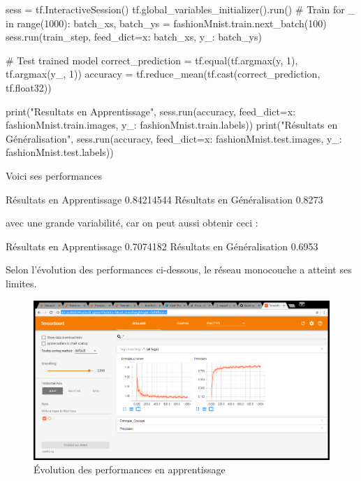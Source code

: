\documentclass[a4paper,11pt]{book}
\theoremstyle{theo}
\begin{document}
\begin{mypython}
sess = tf.InteractiveSession()
tf.global_variables_initializer().run()
# Train
for _ in range(1000):
    batch_xs, batch_ys = fashionMnist.train.next_batch(100)
    sess.run(train_step, feed_dict={x: batch_xs, y_: batch_ys})

# Test trained model
correct_prediction = tf.equal(tf.argmax(y, 1), tf.argmax(y_, 1))
accuracy = tf.reduce_mean(tf.cast(correct_prediction, tf.float32))


print("Resultats en Apprentissage", sess.run(accuracy, feed_dict={x: fashionMnist.train.images, y_: fashionMnist.train.labels}))
print("Résultats en Généralisation", sess.run(accuracy, feed_dict={x: fashionMnist.test.images, y_: fashionMnist.test.labels}))
\end{mypython}

Voici ses performances
\begin{myoutput}
Résultats en Apprentissage 0.84214544
Résultats en Généralisation 0.8273
\end{myoutput}
avec une grande variabilité, car on peut aussi obtenir ceci :
\begin{myoutput}
Résultats en Apprentissage 0.7074182
Résultats en Généralisation 0.6953
\end{myoutput}

Selon l'évolution des performances ci-dessous, le réseau monocouche a atteint ses limites.

\begin{figure}[H]
\begin{center}
\includegraphics[width=15cm]{./figures/scalarFMnistMono.png} 
\end{center}
\caption{Évolution des performances en apprentissage}
\end{figure}
\end{document}
